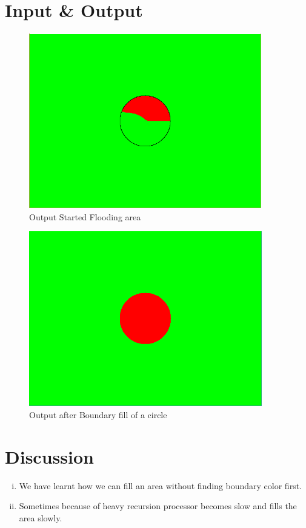 \documentclass[11pt]{report}
\begin{document}
\section{Input \& Output}
\begin{figure}[ht!]
	\centering
	\includegraphics[height=3.0in]{flood_out}
	\caption{Output Started Flooding area}
\end{figure}
\begin{figure}[ht!]
	\centering
	\includegraphics[height=3.0in]{flood_out1}
	\caption{Output after Boundary fill of a circle}
\end{figure}


\section{Discussion}
\begin{enumerate}[(i)]
	\item We have learnt how we can fill an area without finding boundary color first.
	\item Sometimes because of heavy recursion processor becomes slow and fills the area slowly. 
\end{enumerate}
\end{document}
